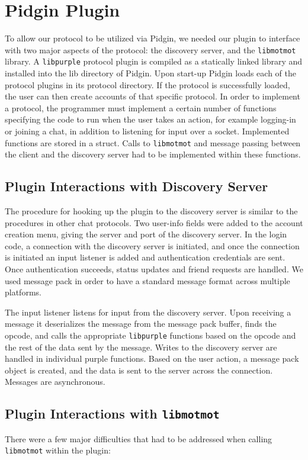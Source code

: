 \documentclass{sig-alternate}
\newcommand\libmotmot{\texttt{libmotmot}\xspace}
\newcommand\libpurple{\texttt{libpurple}\xspace}
\begin{document}

\section{Pidgin Plugin}

To allow our protocol to be utilized via Pidgin, we needed our plugin to
interface with two major aspects of the protocol: the discovery server, and the
\libmotmot library.  A \libpurple protocol plugin is compiled as a statically
linked library and installed into the lib directory of Pidgin. Upon start-up
Pidgin loads each of the protocol plugins in its protocol directory. If the
protocol is successfully loaded, the user can then create accounts of that
specific protocol.  In order to implement a protocol, the programmer must
implement a certain number of functions specifying the code to run when the user
takes an action, for example logging-in or joining a chat, in addition to
listening for input over a socket. Implemented functions are stored in a struct.
Calls to \libmotmot and message passing between the client and the discovery
server had to be implemented within these functions.

\subsection{Plugin Interactions with Discovery Server}
The procedure for hooking up the plugin to the discovery server is similar to
the procedures in other chat protocols. Two user-info fields were added to the
account creation menu, giving the server and port of the discovery server. In
the login code, a connection with the discovery server is initiated, and once
the connection is initiated an input listener is added and authentication
credentials are sent. Once authentication succeeds, status updates and friend
requests are handled. We used message pack in order to have a standard message
format across multiple platforms.

The input listener listens for input from the discovery server. Upon receiving a
message it deserializes the message from the message pack buffer, finds the
opcode, and calls the appropriate \libpurple functions based on the opcode and
the rest of the data sent by the message. Writes to the discovery server are
handled in individual purple functions. Based on the user action, a message pack
object is created, and the data is sent to the server across the connection.
Messages are asynchronous.

\subsection{Plugin Interactions with \libmotmot}
There were a few major difficulties that had to be addressed when calling
\libmotmot within the plugin:
\end{document}
